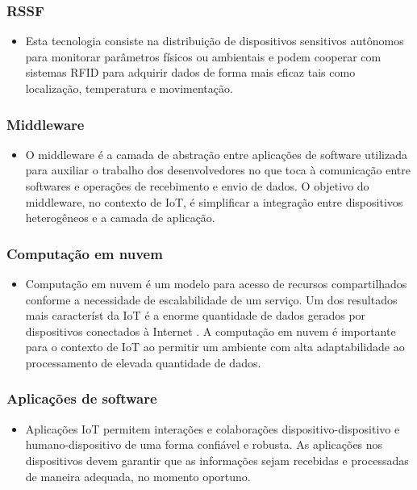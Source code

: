 	\subsubsection{\acrfull{RSSF}}
		\begin{itemize}
			\item Esta tecnologia consiste na distribuição de dispositivos sensitivos autônomos para monitorar parâmetros físicos ou
			ambientais e podem cooperar com sistemas \acrshort{RFID} para adquirir dados de forma mais eficaz tais como localização, temperatura e movimentação.
			\cite{IOTS}
		\end{itemize}
	\subsubsection{Middleware}
		\begin{itemize}
			\item O middleware é a camada de abstração entre aplicações de software utilizada para auxiliar o trabalho dos desenvolvedores
			 no que toca à comunicação entre softwares e operações de recebimento e envio de dados. O objetivo do middleware, no contexto
			  de \acrshort{IoT}, é simplificar a integração entre dispositivos heterogêneos e a camada de aplicação.
		\end{itemize}
	\subsubsection{Computação em nuvem}
		\begin{itemize}
			\item Computação em nuvem é um modelo para acesso de recursos compartilhados conforme a necessidade de escalabilidade de um serviço. Um dos resultados mais característ
			da \acrshort{IoT} é a enorme quantidade de dados gerados por dispositivos conectados à Internet \cite{IOTV}. A computação em nuvem é importante para o contexto de \acrlong{IoT}
			ao permitir um ambiente com alta adaptabilidade ao processamento de elevada quantidade de dados.
		\end{itemize}
	\subsubsection{Aplicações de software}
		\begin{itemize}
			\item Aplicações \acrshort{IoT} permitem interações e colaborações dispositivo-dispositivo e humano-dispositivo de uma forma confiável e robusta.
			As aplicações nos dispositivos devem garantir que as informações sejam recebidas e processadas de maneira adequada, no momento
			oportuno.
		\end{itemize}

